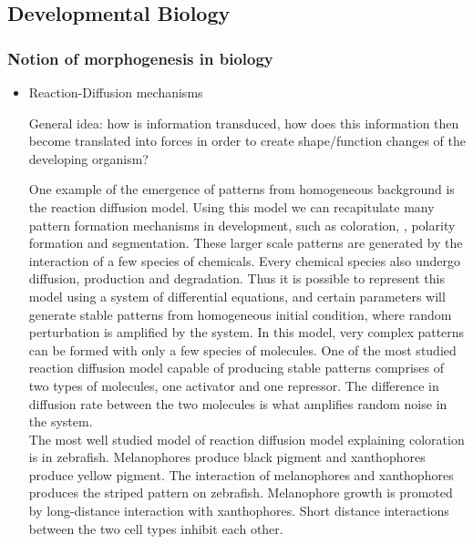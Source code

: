 \documentclass[fleqn,10pt]{wlscirep}
\begin{document}
\subsection*{Developmental Biology}
\subsubsection{Notion of morphogenesis in biology}

\begin{itemize}
\item{Reaction-Diffusion mechanisms} 

General idea: how is information transduced, how does this information then become translated into forces in order to create shape/function changes of the developing organism?

One example of the emergence of patterns from homogeneous background is the reaction diffusion model. Using this model we can recapitulate many pattern formation mechanisms in development, such as coloration, , polarity formation and segmentation. These larger scale patterns are generated by the interaction of a few species of chemicals. Every chemical species also  undergo diffusion, production and degradation. Thus it is possible to represent this model using a system of differential equations, and certain parameters will generate stable patterns from homogeneous initial condition, where random perturbation is amplified by the system. In this model, very complex patterns can be formed with only a few species of molecules\cite{kondo2010reaction}. One of the most studied reaction diffusion model capable of producing stable patterns comprises of two types of molecules, one activator and one repressor. The difference in diffusion rate between the two molecules is what amplifies random noise in the system.\cite{gierer1972theory}\\ 

The most well studied model of reaction diffusion model explaining coloration is in zebrafish. Melanophores produce black pigment and xanthophores produce yellow pigment.\cite{nakamasu2009interactions} The interaction of melanophores and xanthophores produces the striped pattern on zebrafish. Melanophore growth is promoted by long-distance interaction with xanthophores. Short distance interactions between the two cell types inhibit each other. \\


\end{itemize}
\end{document}
